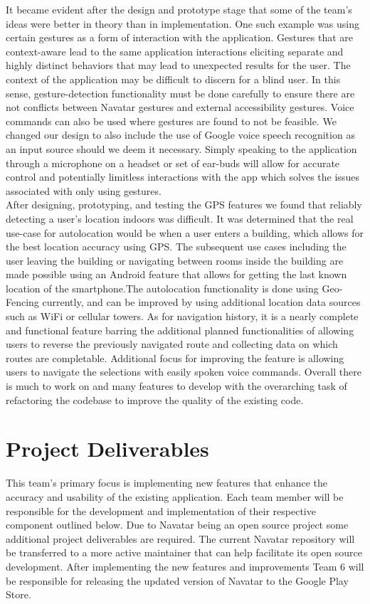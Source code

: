 \documentclass{scrreprt}
\begin{document}
It became evident after the design and prototype stage that some of the team's ideas were better in theory than in implementation. One such example was using certain gestures as a form of interaction with the application. Gestures that are context-aware lead to the same application interactions eliciting separate and highly distinct behaviors that may lead to unexpected results for the user. The context of the application may be difficult to discern for a blind user. In this sense, gesture-detection functionality must be done carefully to ensure there are not conflicts between Navatar gestures and external accessibility gestures. Voice commands can also be used where gestures are found to not be feasible. We changed our design to also include the use of Google voice speech recognition as an input source should we deem it necessary. Simply speaking to the application through a microphone on a headset or set of ear-buds will allow for accurate control and potentially limitless interactions with the app which solves the issues associated with only using gestures.\\

After designing, prototyping, and testing the GPS features we found that reliably detecting a user’s location indoors was difficult. It was determined that the real use-case for autolocation would be when a user enters a building, which allows for the best location accuracy using GPS. The subsequent use cases including the user leaving the building or navigating between rooms inside the building are made possible using an Android feature that allows for getting the last known location of the smartphone.The autolocation functionality is done using Geo-Fencing currently, and can be improved by using additional location data sources such as WiFi or cellular towers. As for navigation history, it is a nearly complete and functional feature barring the additional planned functionalities of allowing users to reverse the previously navigated route and collecting data on which routes are completable. Additional focus for improving the feature is allowing users to navigate the selections with easily spoken voice commands. Overall there is much to work on and many features to develop with the overarching task of refactoring the codebase to improve the quality of the existing code.

\chapter{Project Deliverables}
This team’s primary focus is implementing new features that enhance the accuracy and usability of the existing application. Each team member will be responsible for the development and implementation of their respective component outlined below. Due to Navatar being an open source project some additional project deliverables are required. The current Navatar repository will be transferred to a more active maintainer that can help facilitate its open source development. After implementing the new features and improvements Team 6 will be responsible for releasing the updated version of Navatar to the Google Play Store.
\end{document}
